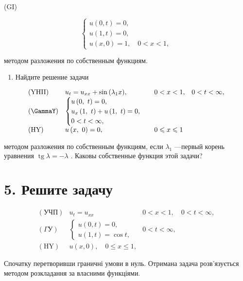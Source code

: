 \documentclass[
  ukrainian,
]{article}
\providecommand{\tightlist}{%
  \setlength{\itemsep}{0pt}\setlength{\parskip}{0pt}}
\begin{document}
(GI)

\[
\begin{cases} u(0, t) = 0, \\ u(1, t) = 0, \\ u(x, 0) = 1, \quad 0 < x < 1, \end{cases}
\]

методом разложения по собственным функциям.

\begin{enumerate}
\def\labelenumi{\arabic{enumi}.}
\setcounter{enumi}{3}
\tightlist
\item
  Найдите решение задачи
\end{enumerate}

\[
\begin{array}{llll} (\text{YHII}) & u_t = u_{xx} + \sin{(\lambda_1 x)}, & 0 < x < 1, & 0 <t < \infty, \\ (\text{\GammaY}) & \begin{cases} u\left(0, \ t\right) = 0, \\ u_x\left(1, \ t\right) + u\left(1, \ t\right) = 0, \\ 0 < t < \infty, \end{cases} \\ (\text{HY}) & u\left(x, \ 0\right) = 0, & 0 \leqslant x \leqslant 1 \end{array}
\]

методом разложения по собственным функциям, если \(\lambda_1\) ---первый
корень уравнения \(\operatorname{tg} \lambda = -\lambda\) . Каковы
собственные функция этой задачи?

\section{5. Решите
задачу}\label{ux440ux435ux448ux438ux442ux435-ux437ux430ux434ux430ux447ux443}

\[
\begin{array}{lll} (\text{УЧП}) & u_t = u_{xx} & 0 < x < 1, \quad 0 < t < \infty, \\ (\Gamma \text{У}) & \begin{cases} u(0, t) = 0, \\ u(1, t) = \cos t, \end{cases} & 0 < t < \infty, \\ (\text{HY}) & u(x, 0), \quad 0 \leqslant x \leqslant 1, \end{array}
\]

Спочатку перетворивши граничні умови в нуль. Отримана задача
розв'язується методом розкладання за власними функціями.
\end{document}
